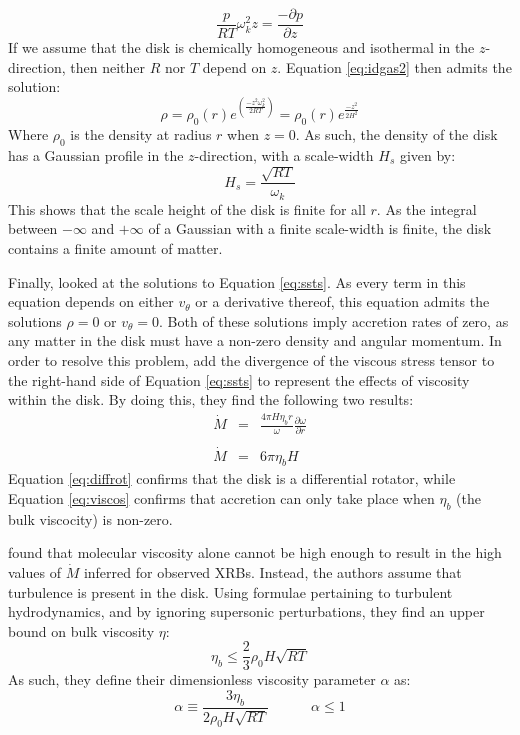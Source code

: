 \begin{equation}
\frac{p}{RT}\omega_k^2 z=\frac{-\partial p}{\partial z}\label{eq:idgas2}
\end{equation}
If we assume that the disk is chemically homogeneous and isothermal in the $z$-direction, then neither $R$ nor $T$ depend on $z$.  Equation \ref{eq:idgas2} then admits the solution:
\begin{equation}
\rho=\rho_0(r)e^{\left(\frac{-z^2\omega_k^2}{2RT}\right)}=\rho_0(r)e^{\frac{-z^2}{2H^2}}
\end{equation}
Where $\rho_0$ is the density at radius $r$ when $z=0$.  As such, the density of the disk has a Gaussian profile in the $z$-direction, with a scale-width $H_s$ given by:
\begin{equation}
H_s=\frac{\sqrt{RT}}{\omega_k}
\end{equation}
This shows that the scale height of the disk is finite for all $r$.  As the integral between $-\infty$ and $+\infty$ of a Gaussian with a finite scale-width is finite, the disk contains a finite amount of matter.
\par Finally, \citeauthor{Shakura_Disk} looked at the solutions to Equation \ref{eq:ssts}.  As every term in this equation depends on either $v_\theta$ or a derivative thereof, this equation admits the solutions $\rho=0$ or $v_\theta=0$.  Both of these solutions imply accretion rates of zero, as any matter in the disk must have a non-zero density and angular momentum.  In order to resolve this problem, \citet{Shakura_Disk} add the divergence of the viscous stress tensor \citep{Landau_Tensor} to the right-hand side of Equation \ref{eq:ssts} to represent the effects of viscosity within the disk.  By doing this, they find the following two results:
\begin{eqnarray}
\dot{M}&=&\frac{4\pi H\eta_b r}{\omega}\frac{\partial\omega}{\partial r}\label{eq:diffrot}\\\nonumber\\
\dot{M}&=&6\pi\eta_b H\label{eq:viscos}
\end{eqnarray}
Equation \ref{eq:diffrot} confirms that the disk is a differential rotator, while Equation \ref{eq:viscos} confirms that accretion can only take place when $\eta_b$ (the bulk viscocity) is non-zero.
\par \citet{Shakura_Disk} found that molecular viscosity alone cannot be high enough to result in the high values of $\dot{M}$ inferred for observed XRBs.  Instead, the authors assume that turbulence is present in the disk.  Using formulae pertaining to turbulent hydrodynamics, and by ignoring supersonic perturbations, they find an upper bound on bulk viscosity $\eta$:
\begin{equation}
\eta_b\leq\frac{2}{3}\rho_0H\sqrt{RT}
\end{equation}
As such, they define their dimensionless viscosity parameter $\alpha$ as:
\begin{equation}
\alpha\equiv\frac{3\eta_b}{2\rho_0H\sqrt{RT}}\quad\quad\quad\alpha\leq1
\end{equation}

